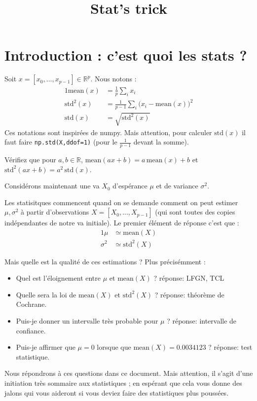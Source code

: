 \documentclass{article}
\title{Stat's trick}
\def\std{\text{std}}
\def\mean{\mathrm{mean}}
\begin{document}
\maketitle



\section{Introduction : c'est quoi les stats ? }


   
Soit $x=[x_0,...,x_{p-1}]\in \mathbb R^p$. Nous notons :
 \begin{alignat*}{1}
 \mean(x) &= \frac 1 p   \sum_i x_i \\
 \std^2(x) &= \frac 1 {p-1} \sum_i \Big(x_i - \mean(x) \Big)^2\\
  \std (x) &= \sqrt{\std^2(x)}
  \end{alignat*}
   Ces notations sont inspirées de numpy. Mais attention, pour calculer $\std(x)$  il faut faire   \verb$np.std(X,ddof=1)$  (pour le $\frac1{p-1}$ devant la somme). 
   
 
  \begin{exo}
   Vérifiez que pour $a,b\in \mathbb R$, $\mean(ax+b) = a \, \mean(x) + b$ et $\std^2(ax+b)=a^2 \, \std(x)$.
  \end{exo}


Considérons maintenant une va $X_0$ d'espérance $\mu$ et de variance $\sigma^2$.   

Les statisitques commencent quand on se demande comment on peut estimer  $\mu,\sigma^2$ à partir d'observations $X=[X_0,...,X_{p-1}]$ (qui sont toutes des copies indépendantes de notre va initiale).  Le premier élément de réponse c'est que : 
\begin{alignat}{1}
\mu &  \simeq \mean(X) \\
\sigma^2  & \simeq \std^2(X)
\end{alignat}

Mais quelle est la qualité de ces estimations ?  Plus précisémment : 
\begin{itemize}
\item Quel est l'éloignement entre $\mu$   et $\mean(X) $ ?    réponse:   LFGN, TCL
\item Quelle sera la loi de $ \mean(X)$ et $\std^2(X)$ ?  réponse:  théorème de Cochrane.
\item Puis-je donner un intervalle très probable pour $\mu$ ? réponse: intervalle de confiance. 
\item Puis-je affirmer que $\mu=0$ lorsque que $\mean(X)=0.0034123$ ? réponse: test statistique. 
\end{itemize}
Nous répondrons à ces questions dans ce document. Mais attention, il s'agit d'une initiation très sommaire aux statistiques ; en espérant que cela vous donne des jalons  qui vous aideront si vous deviez faire des statistiques plus poussées.  
\end{document}
